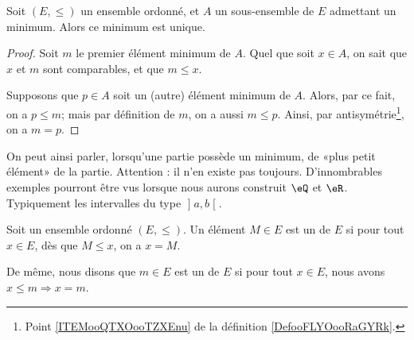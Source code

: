 \begin{proposition}\label{PROPooUniciteMinMax}
	Soit \( (E, \leq) \) un ensemble ordonné, et \( A \) un sous-ensemble de \( E \) admettant un minimum. Alors ce minimum est unique.
\end{proposition}

\begin{proof}
	Soit \( m \) le premier élément minimum de \( A \). Quel que soit \(x \in A \), on sait que \( x \) et \( m \) sont comparables, et que \( m \leq x \).

	Supposons que \( p \in A \) soit un (autre) élément minimum de \( A \). Alors, par ce fait, on a \( p \leq m \); mais par définition de \( m \), on a aussi \( m \leq p \). Ainsi, par antisymétrie\footnote{Point \ref{ITEMooQTXOooTZXEnu} de la définition \ref{DefooFLYOooRaGYRk}.}, on a \( m = p\).
\end{proof}

\begin{normaltext}\label{NORMooPlusPetitElement}
	On peut ainsi parler, lorsqu'une partie possède un minimum, de «plus petit élément» de la partie. Attention : il n'en existe pas toujours. D'innombrables exemples pourront être vus lorsque nous aurons construit \( \eQ\) et \( \eR\). Typiquement les intervalles du type \( \mathopen] a , b \mathclose[\).
\end{normaltext}


\begin{definition}        \label{DEFooBZNRooYRPGme}
	Soit un ensemble ordonné \( (E,\leq)\). Un élément \(M\in E\) est un  de \( E\) si pour tout \( x\in E\), dès que \( M\leq x\), on a \(x=M\).

	De même, nous disons que \( m\in E\) est un  de \( E\) si pour tout \( x\in E\), nous avons \( x\leq m\Rightarrow x=m\).
\end{definition}

